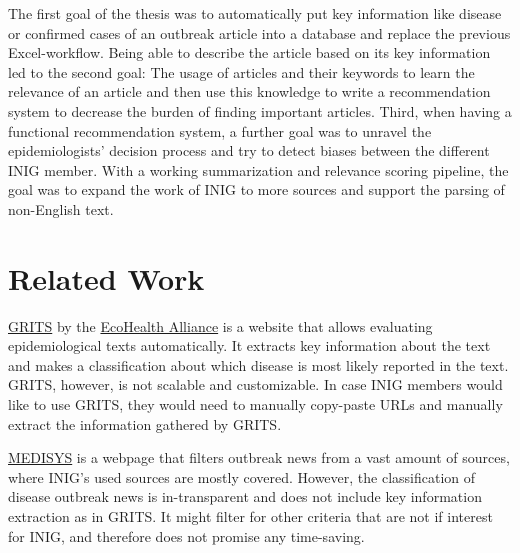 The first goal of the thesis was to automatically put key information like disease or confirmed cases of an outbreak article into a database and replace the previous Excel-workflow. Being able to describe the article based on its key information led to the second goal: The usage of articles and their keywords to learn the relevance of an article and then use this knowledge to write a recommendation system to decrease the burden of finding important articles.
Third, when having a functional recommendation system, a further goal was to unravel the epidemiologists' decision process and try to detect biases between the different INIG member.
With a working summarization and relevance scoring pipeline, the goal was to expand the work of INIG to more sources and support the parsing of non-English text.


\section{Related Work}
\href{https://grits.eha.io}{GRITS} by the \href{https://www.ecohealthalliance.org}{EcoHealth Alliance} is a website that allows evaluating epidemiological texts automatically. It extracts key information about the text and makes a classification about which disease is most likely reported in the text. GRITS, however, is not scalable and customizable. In case INIG members would like to use GRITS, they would need to manually copy-paste URLs and manually extract the information gathered by GRITS.

\href{http://medisys.newsbrief.eu}{MEDISYS} is a webpage that filters outbreak news from a vast amount of sources, where INIG's used sources are mostly covered. However, the classification of disease outbreak news is in-transparent and does not include key information extraction as in GRITS. It might filter for other criteria that are not if interest for INIG, and therefore does not promise any time-saving.
